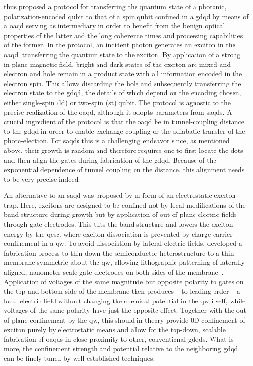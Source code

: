 \citet{Jocker2019} thus proposed a protocol for transferring the quantum state of a photonic, polarization-encoded qubit to that of a spin qubit confined in a \gls{gdqd} by means of a \gls{oaqd} serving as intermediary in order to benefit from the benign optical properties of the latter and the long coherence times and processing capabilities of the former.
In the protocol, an incident photon generates an exciton in the \gls{oaqd}, transferring the quantum state to the exciton.
By application of a strong in-plane magnetic field, bright and dark states of the exciton are mixed and electron and hole remain in a product state with all information encoded in the electron spin.
This allows discarding the hole and subsequently transferring the electron state to the \gls{gdqd}, the details of which depend on the encoding chosen, either single-spin (\gls{ld}) or two-spin (\gls{st}) qubit.
The protocol is agnostic to the precise realization of the \gls{oaqd}, although it adopts parameters from \glspl{saqd}.
A crucial ingredient of the protocol is that the \gls{oaqd} be in tunnel-coupling distance to the \gls{gdqd} in order to enable exchange coupling or the adiabatic transfer of the photo-electron.
For \glspl{saqd} this is a challenging endeavor since, as mentioned above, their growth is random and therefore requires one to first locate the dots and then align the gates during fabrication of the \gls{gdqd}.
Because of the exponential dependence of tunnel coupling on the distance, this alignment needs to be very precise indeed.

An alternative to an \gls{saqd} was proposed by \citet{Descamps2021} in form of an electrostatic exciton trap.
Here, excitons are designed to be confined not by local modifications of the band structure during growth but by application of out-of-plane electric fields through gate electrodes.
This tilts the band structure and lowers the exciton energy by the \gls{qcse}, where exciton dissociation is prevented by charge carrier confinement in a \gls{qw}.
To avoid dissociation by lateral electric fields, \citet{Descamps2021} developed a fabrication process to thin down the semiconductor heterostructure to a thin membrane symmetric about the \gls{qw}, allowing lithographic patterning of laterally aligned, nanometer-scale gate electrodes on both sides of the membrane~\cite{Descamps2023}.
Application of voltages of the same magnitude but opposite polarity to gates on the top and bottom side of the membrane then produces -- to leading order -- a local electric field without changing the chemical potential in the \gls{qw} itself, while voltages of the same polarity have just the opposite effect.
Together with the out-of-plane confinement by the \gls{qw}, this should in theory provide 0D-confinement of exciton purely by electrostatic means and allow for the top-down, scalable fabrication of \glspl{oaqd} in close proximity to other, conventional \glspl{gdqd}.
What is more, the confinement strength and potential relative to the neighboring \gls{gdqd} can be finely tuned by well-established techniques.

